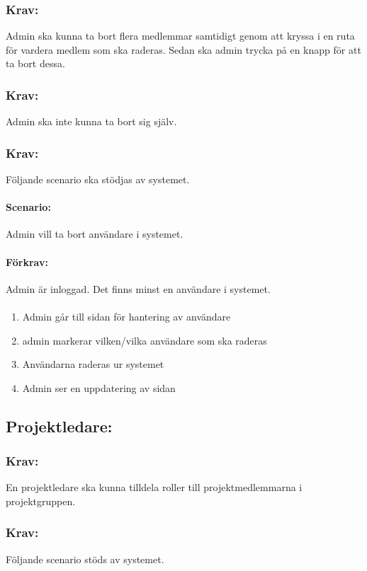 \documentclass[paper=a4, fontsize=11pt,twoside]{article}
\begin{document}
	\subsubsection{Krav:} Admin ska kunna ta bort flera medlemmar samtidigt genom att kryssa i en ruta för vardera medlem som ska raderas. Sedan ska admin trycka på en knapp för att ta bort dessa.
	\subsubsection{Krav:} Admin ska inte kunna ta bort sig själv.
	
	\subsubsection{Krav:} Följande scenario ska stödjas av systemet. 
	\paragraph{Scenario:}
	Admin vill ta bort användare i systemet.
	\paragraph{Förkrav:}
	Admin är inloggad. Det finns minst en användare i systemet.
	\paragraph{}
	\begin{enumerate}
		\item Admin går till sidan för hantering av användare
		\item admin markerar vilken/vilka användare som ska raderas
		\item Användarna raderas ur systemet
		\item Admin ser en uppdatering av sidan
	\end{enumerate}
	
	\subsection{Projektledare:}
	
	\subsubsection{Krav:} En projektledare ska kunna tilldela roller till projektmedlemmarna i projektgruppen.
	
	\subsubsection{Krav:}
	Följande scenario stöds av systemet.
\end{document}
